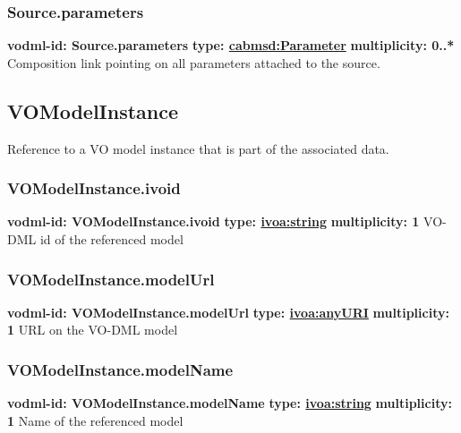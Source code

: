     \subsubsection{Source.parameters}
      \textbf{vodml-id: Source.parameters} \newline
      \textbf{type: \hyperref[sect:Parameter]{cabmsd:Parameter}} \newline
      \textbf{multiplicity: 0..*} \newline 
      Composition link pointing on all parameters attached to the source.

  \subsection{VOModelInstance}
  \label{sect:VOModelInstance}
    Reference to a VO model instance that is part of the associated data.

    \subsubsection{VOModelInstance.ivoid}
      \textbf{vodml-id: VOModelInstance.ivoid} \newline
      \textbf{type: \hyperref[sect:ivoa]{ivoa:string}} \newline
      \textbf{multiplicity: 1} \newline 
      VO-DML id of the referenced model

    \subsubsection{VOModelInstance.modelUrl}
      \textbf{vodml-id: VOModelInstance.modelUrl} \newline
      \textbf{type: \hyperref[sect:ivoa]{ivoa:anyURI}} \newline
      \textbf{multiplicity: 1} \newline 
      URL on the VO-DML model

    \subsubsection{VOModelInstance.modelName}
      \textbf{vodml-id: VOModelInstance.modelName} \newline
      \textbf{type: \hyperref[sect:ivoa]{ivoa:string}} \newline
      \textbf{multiplicity: 1} \newline 
      Name of the referenced model


